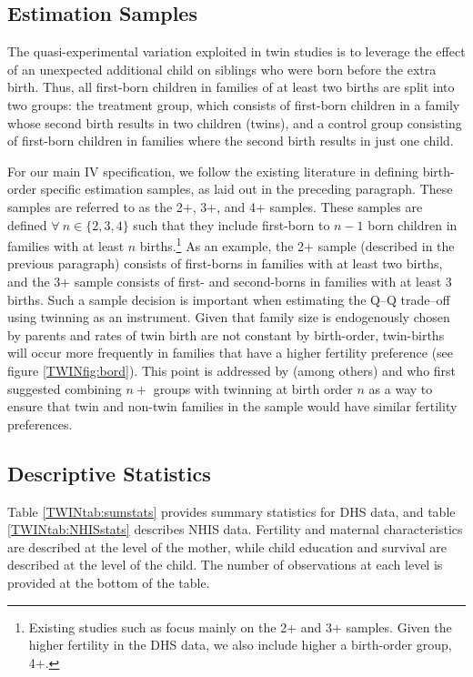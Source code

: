 \subsection{Estimation Samples}                    \label{TWINsscn:samples}
The quasi-experimental variation exploited in twin studies is to leverage the 
effect of an unexpected additional child on siblings who were born before the 
extra birth.  Thus, all first-born children in families of at least two births
are split into two groups: the treatment group, which consists of first-born
children in a family whose second birth results in two children (twins), and a
control group consisting of first-born children in families where the second
birth results in just one child.

For our main IV specification, we follow the existing literature in defining
birth-order specific estimation samples, as laid out in the preceding 
paragraph. These samples are referred to as the 2+, 3+, and 4+ samples. These 
samples are defined $\forall\ n \in \{2, 3, 4\}$ such that they include 
first-born to $n-1$ born children in families with at least $n$ births.\footnote{
Existing studies such as \citet{Angristetal2010} focus mainly on the 2+ and 3+ 
samples. Given the higher fertility in the DHS data, we also include higher a
birth-order group, 4+.} As an example, the 2+ sample (described in the previous
paragraph) consists of first-borns in families with at least two births, and the 
3+ sample consists of first- and second-borns in families with at least 3 births.
Such a sample decision is important when estimating the Q--Q trade--off using 
twinning as an instrument. Given that family size is endogenously chosen by 
parents and rates of twin birth are not constant by birth-order, twin-births will 
occur more frequently in families that have a higher fertility preference (see
figure \ref{TWINfig:bord}). This point is addressed by (among others) 
\citet{RosenzweigWolpin1980} and \citet{Blacketal2005} who first suggested 
combining $n+$ groups with twinning at birth order $n$ as a way to ensure that 
twin and non-twin families in the sample would have similar fertility 
preferences.

\subsection{Descriptive Statistics}                \label{TWINsscn:descriptives}
Table \ref{TWINtab:sumstats} provides summary statistics for DHS data, and table
\ref{TWINtab:NHISstats} describes NHIS data.  Fertility and maternal 
characteristics are described at the level of the mother, while child education 
and survival are described at the level of the child. The number of observations 
at each level is provided at the bottom of the table.

